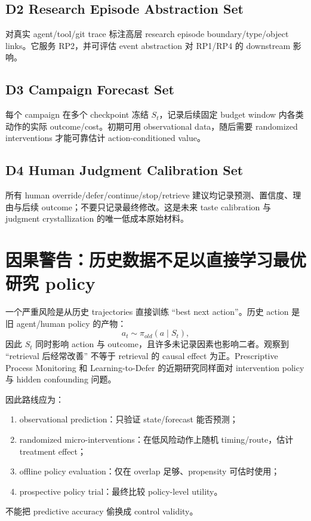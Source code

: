\documentclass[11pt,a4paper]{ctexart}
\begin{document}
\subsection{D2 Research Episode Abstraction Set}
对真实 agent/tool/git trace 标注高层 research episode boundary/type/object links。它服务 RP2，并可评估 event abstraction 对 RP1/RP4 的 downstream 影响。

\subsection{D3 Campaign Forecast Set}
每个 campaign 在多个 checkpoint 冻结 $S_t$，记录后续固定 budget window 内各类动作的实际 outcome/cost。初期可用 observational data，随后需要 randomized interventions 才能可靠估计 action-conditioned value。

\subsection{D4 Human Judgment Calibration Set}
所有 human override/defer/continue/stop/retrieve 建议均记录预测、置信度、理由与后续 outcome；不要只记录最终修改。这是未来 taste calibration 与 judgment crystallization 的唯一低成本原始材料。

\section{因果警告：历史数据不足以直接学习最优研究 policy}

一个严重风险是从历史 trajectories 直接训练 ``best next action''。历史 action 是旧 agent/human policy 的产物：
\begin{equation}
a_t\sim\pi_{old}(a\mid S_t),
\end{equation}
因此 $S_t$ 同时影响 action 与 outcome，且许多未记录因素也影响二者。观察到 ``retrieval 后经常改善'' 不等于 retrieval 的 causal effect 为正。Prescriptive Process Monitoring 和 Learning-to-Defer 的近期研究同样面对 intervention policy 与 hidden confounding 问题\parencite{montreuil2026causaldefer,delias2026policy}。

因此路线应为：
\begin{enumerate}
\item observational prediction：只验证 state/forecast 能否预测；
\item randomized micro-interventions：在低风险动作上随机 timing/route，估计 treatment effect；
\item offline policy evaluation：仅在 overlap 足够、propensity 可估时使用；
\item prospective policy trial：最终比较 policy-level utility。
\end{enumerate}
不能把 predictive accuracy 偷换成 control validity。
\end{document}
